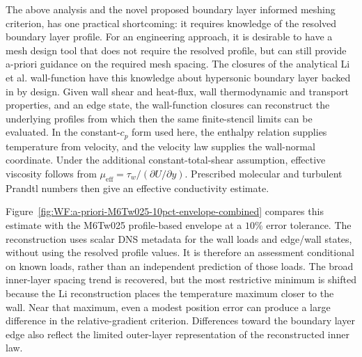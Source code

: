 The above analysis and the novel proposed boundary layer informed meshing criterion, has one practical shortcoming: it requires knowledge of the resolved boundary layer profile. For an engineering approach, it is desirable to have a mesh design tool that does not require the resolved profile, but can still provide a-priori guidance on the required mesh spacing. The closures of the analytical Li et al. wall-function \cite{li2025WF} have this knowledge about hypersonic boundary layer backed in by design. Given wall shear and heat-flux, wall thermodynamic and transport properties, and an edge state, the wall-function closures can reconstruct the underlying profiles from which then the same finite-stencil limits can be evaluated. In the constant-$c_p$ form used here, the enthalpy relation supplies temperature from velocity, and the velocity law supplies the wall-normal coordinate. Under the additional constant-total-shear assumption, effective viscosity follows from $\mu_{\mathrm{eff}}=\tau_w/(\partial U/\partial y)$. Prescribed molecular and turbulent Prandtl numbers then give an effective conductivity estimate.
\par\medskip

Figure~\ref{fig:WF:a-priori-M6Tw025-10pct-envelope-combined} compares this estimate with the M6Tw025 profile-based envelope at a $10\%$ error tolerance. The reconstruction uses scalar DNS metadata for the wall loads and edge/wall states, without using the resolved profile values. It is therefore an assessment conditional on known loads, rather than an independent prediction of those loads. The broad inner-layer spacing trend is recovered, but the most restrictive minimum is shifted because the Li reconstruction places the temperature maximum closer to the wall. Near that maximum, even a modest position error can produce a large difference in the relative-gradient criterion. Differences toward the boundary layer edge also reflect the limited outer-layer representation of the reconstructed inner law.

